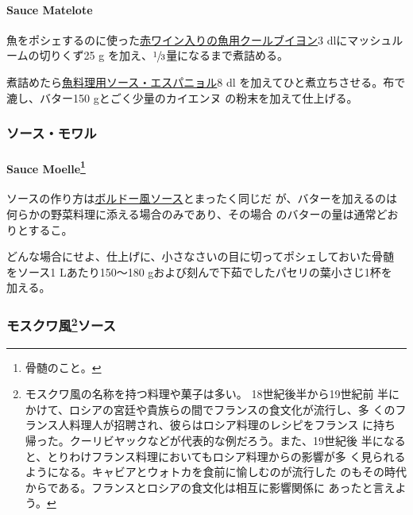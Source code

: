 \hypertarget{sauce-matelote}{%
\paragraph{Sauce Matelote}\label{sauce-matelote}}


魚をポシェするのに使った\href{}{赤ワイン入りの魚用クールブイヨン}3
dlにマッシュルームの切りくず25 g
を加え、\(\sfrac{1}{3}\)量になるまで煮詰める。

煮詰めたら\protect\hyperlink{sauce-espagnole-maigre}{魚料理用ソース・エスパニョル}8
dl を加えてひと煮立ちさせる。布で漉し、バター150 gとごく少量のカイエンヌ
の粉末を加えて仕上げる。

\maeaki

\hypertarget{ux30bdux30fcux30b9ux30e2ux30efux30eb}{%
\subsubsection{ソース・モワル}\label{ux30bdux30fcux30b9ux30e2ux30efux30eb}}

\hypertarget{sauce-moelle}{%
\paragraph[Sauce Moelle]{\texorpdfstring{Sauce Moelle\footnote{骨髄のこと。}}{Sauce Moelle}}\label{sauce-moelle}}


ソースの作り方は\protect\hyperlink{sauce-bordelaise}{ボルドー風ソース}とまったく同じだ
が、バターを加えるのは何らかの野菜料理に添える場合のみであり、その場合
のバターの量は通常どおりとするこ。

どんな場合にせよ、仕上げに、小さなさいの目に切ってポシェしておいた骨髄
をソース1 Lあたり150〜180 gおよび刻んで下茹でしたパセリの葉小さじ1杯を
加える。

\maeaki

\hypertarget{ux30e2ux30b9ux30afux30efux98a856ux30bdux30fcux30b9}{%
\subsubsection[モスクワ風ソース]{\texorpdfstring{モスクワ風\footnote{モスクワ風の名称を持つ料理や菓子は多い。
  18世紀後半から19世紀前
  半にかけて、ロシアの宮廷や貴族らの間でフランスの食文化が流行し、多
  くのフランス人料理人が招聘され、彼らはロシア料理のレシピをフランス
  に持ち帰った。クーリビヤックなどが代表的な例だろう。また、19世紀後
  半になると、とりわけフランス料理においてもロシア料理からの影響が多
  く見られるようになる。キャビアとウォトカを食前に愉しむのが流行した
  のもその時代からである。フランスとロシアの食文化は相互に影響関係に
  あったと言えよう。}ソース}{モスクワ風ソース}}\label{ux30e2ux30b9ux30afux30efux98a856ux30bdux30fcux30b9}}

